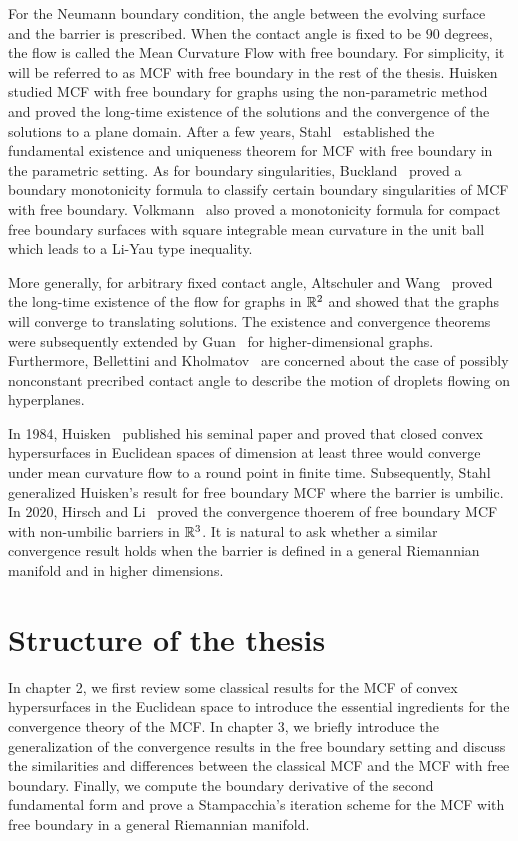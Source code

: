 For the Neumann boundary condition, the angle between the evolving surface and the barrier is prescribed. When the contact angle is fixed to be $90$ degrees, the flow is called the Mean Curvature Flow with free boundary. For simplicity, it will be referred to as MCF with free boundary in the rest of the thesis. Huisken~\cite{huisken_non-parametric_1989} studied MCF with free boundary for graphs using the non-parametric method and proved the long-time existence of the solutions and the convergence of the solutions to a plane domain. After a few years, Stahl~\cite{stahl_regularity_1996} established the fundamental existence and uniqueness theorem for MCF with free boundary in the parametric setting. As for boundary singularities, Buckland~\cite{buckland_mean_2005} proved a boundary monotonicity formula to classify certain boundary singularities of MCF with free boundary. Volkmann~\cite{volkmann_monotonicity_2016} also proved a monotonicity formula for compact free boundary surfaces with square integrable mean curvature in the unit ball which leads to a Li-Yau type inequality.

More generally, for arbitrary fixed contact angle, Altschuler and Wang~\cite{altschuler_translating_1994} proved the long-time existence of the flow for graphs in $\mathbb{R}^2$ and showed that the graphs will converge to translating solutions. The existence and convergence theorems were subsequently extended by Guan~\cite{guan1996mean} for higher-dimensional graphs. Furthermore, Bellettini and Kholmatov~\cite{bellettini_minimizing_2018} are concerned about the case of possibly nonconstant precribed contact angle to describe the motion of droplets flowing on hyperplanes.
 
In 1984, Huisken~\cite{huisken_flow_1984} published his seminal paper and proved that closed convex hypersurfaces in Euclidean spaces of dimension at least three would converge under mean curvature flow to a round point in finite time. Subsequently, Stahl~\cite{stahl_convergence_1996} generalized Huisken's result for free boundary MCF where the barrier is umbilic. In 2020, Hirsch and Li~\cite{hirsch2020contracting} proved the convergence thoerem of free boundary MCF with non-umbilic barriers in $\mathbb{R}^3$. It is natural to ask whether a similar convergence result holds when the barrier is defined in a general Riemannian manifold and in higher dimensions.

\section{Structure of the thesis}

In chapter 2, we first review some classical results for the MCF of convex hypersurfaces in the Euclidean space to introduce the essential ingredients for the convergence theory of the MCF. In chapter 3, we briefly introduce the generalization of the convergence results in the free boundary setting and discuss the similarities and differences between the classical MCF and the MCF with free boundary. Finally, we compute the boundary derivative of the second fundamental form and prove a Stampacchia’s iteration scheme for the MCF with free boundary in a general Riemannian manifold.

\chapterend